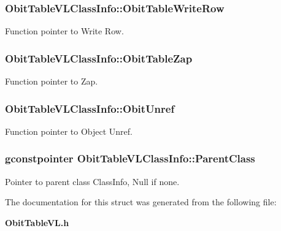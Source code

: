 \subsubsection{ {\bf Obit\-Table\-VLClass\-Info::Obit\-Table\-Write\-Row}}\label{structObitTableVLClassInfo_o26}


Function pointer to Write Row. 

\subsubsection{ {\bf Obit\-Table\-VLClass\-Info::Obit\-Table\-Zap}}\label{structObitTableVLClassInfo_o19}


Function pointer to Zap. 

\subsubsection{ {\bf Obit\-Table\-VLClass\-Info::Obit\-Unref}}\label{structObitTableVLClassInfo_o11}


Function pointer to Object Unref. 

\subsubsection{\setlength{\rightskip}{0pt plus 5cm}gconstpointer {\bf Obit\-Table\-VLClass\-Info::Parent\-Class}}\label{structObitTableVLClassInfo_o3}


Pointer to parent class Class\-Info, Null if none. 



The documentation for this struct was generated from the following file:\begin{CompactItemize}
\item 
{\bf Obit\-Table\-VL.h}\end{CompactItemize}
